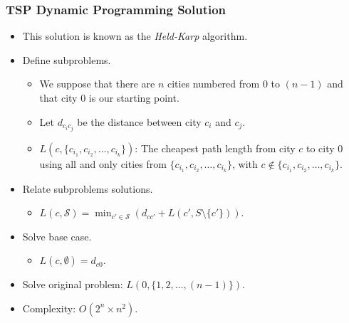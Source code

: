\documentclass{beamer}
\begin{document}
\begin{frame}%
\frametitle{TSP Dynamic Programming Solution}

\footnotesize

\begin{itemize}

\item This solution is known as the \emph{Held-Karp} algorithm.

\vspace{0.1cm}

\item<2-> Define subproblems.
\begin{itemize}
\footnotesize
\item<2-> We suppose that there are $n$ cities numbered from $0$ to $(n-1)$ and that city $0$ is our starting point.
\vspace{0.05cm}
\item<2-> Let $d_{c_ic_j}$ be the distance between city $c_i$ and $c_j$.
\vspace{0.05cm}
\item<3-> $L(c, \{c_{i_1}, c_{i_2}, \ldots, c_{i_k}\})$: The cheapest path length from city $c$ to city $0$ using all and only
cities from $\{c_{i_1}, c_{i_2}, \ldots, c_{i_k}\}$, with $c \not\in \{c_{i_1}, c_{i_2}, \ldots, c_{i_k}\}$.
\end{itemize}

\vspace{0.1cm}

\item<4-> Relate subproblems solutions.
\begin{itemize}
\footnotesize
\item<4-> $L(c, \mathcal{S}) = \min_{c' \in \mathcal{S}} (d_{cc'} + L(c', S \setminus \{c'\}))$.
\end{itemize}

\vspace{0.1cm}

\item<5-> Solve base case.
\begin{itemize}
\footnotesize
\item<5-> $L(c, \emptyset) = d_{c0}$.
\end{itemize}

\vspace{0.1cm}

\item<6-> Solve original problem: $L(0, \{1, 2, \ldots, (n - 1)\})$.

\vspace{0.1cm}

\item<7-> Complexity: $O(2^n\times n^2)$.
\end{itemize}

\end{frame}
\end{document}
